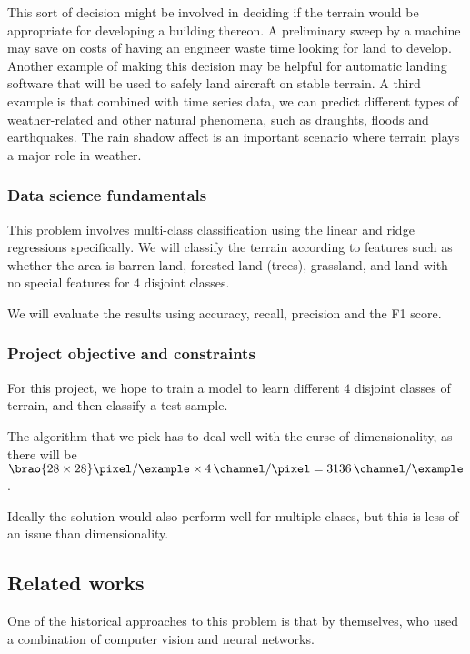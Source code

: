\documentclass[11pt]{report}
\DeclarePairedDelimiter\brao()%
\begin{document}
This sort of decision might be involved in deciding if the terrain would be appropriate for developing a building thereon.
A preliminary sweep by a machine may save on costs of having an engineer waste time looking for land to develop.
Another example of making this decision may be helpful for automatic landing software that will be used to safely land aircraft on stable terrain.
A third example is that combined with time series data, we can predict different types
of weather-related and other natural phenomena,
such as draughts, floods and earthquakes.
The rain shadow affect is an important scenario where terrain plays a major role in weather.

\subsubsection{Data science fundamentals}

This problem involves multi-class classification
using the linear and ridge regressions specifically.
We will classify the terrain according to features such as whether the area is
barren land, forested land (trees), grassland, and land with no special features
for \(4\) disjoint classes.

We will evaluate the results using
accuracy, recall, precision and the F1 score.

\subsubsection{Project objective and constraints}

For this project, we hope to train a model to learn different \(4\) disjoint classes of terrain, and then classify a test sample.

The algorithm that we pick has to deal well with the curse of dimensionality,
as there will be
\(
    \SI[parse-numbers=false]{\brao{28\times28}\!}{\pixel\per\example}
    \times \SI4{\channel\per\pixel}
    = \SI{3136}{\channel\per\example}
\).

Ideally the solution would also perform well for multiple clases,
but this is less of an issue than dimensionality.

\subsection{Related works}\label{ssc:related works}

One of the historical approaches to this problem is that by \textcite{Basu2015a} themselves,
who
used a combination of computer vision and neural networks.
\end{document}
